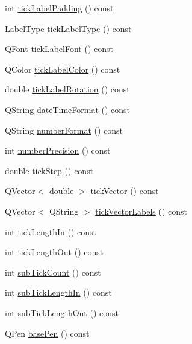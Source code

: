 \begin{DoxyCompactItemize}
\item 
int \hyperlink{class_q_c_p_axis_af7bc2fac3f95949ecd0204d20dc1463b}{tick\-Label\-Padding} () const 
\item 
\hyperlink{class_q_c_p_axis_a4a7da0166f755f5abac23b765d184cad}{Label\-Type} \hyperlink{class_q_c_p_axis_a8a6f58a1ce12cfc4fadd379167668e8d}{tick\-Label\-Type} () const 
\item 
Q\-Font \hyperlink{class_q_c_p_axis_af6d7ad17f3398b114a413f7a3dc5ef9d}{tick\-Label\-Font} () const 
\item 
Q\-Color \hyperlink{class_q_c_p_axis_ac86d0636aa55ddd94df171f609897a32}{tick\-Label\-Color} () const 
\item 
double \hyperlink{class_q_c_p_axis_ab9199d72b8c4c06cc6c9b928c30d00d2}{tick\-Label\-Rotation} () const 
\item 
Q\-String \hyperlink{class_q_c_p_axis_a132b54ae184a12ed24c9af24f53dc70b}{date\-Time\-Format} () const 
\item 
Q\-String \hyperlink{class_q_c_p_axis_ae6729b40845b29ffa5a440aa53cec215}{number\-Format} () const 
\item 
int \hyperlink{class_q_c_p_axis_a91cb2825060ac79a889296377fe0c7c1}{number\-Precision} () const 
\item 
double \hyperlink{class_q_c_p_axis_a0e6120d24266544441ab691f316a1b03}{tick\-Step} () const 
\item 
Q\-Vector$<$ double $>$ \hyperlink{class_q_c_p_axis_a5b00b14f480f926df976cc6c52309e78}{tick\-Vector} () const 
\item 
Q\-Vector$<$ Q\-String $>$ \hyperlink{class_q_c_p_axis_a64e6fa81f943ad33dcaf3fa606687b93}{tick\-Vector\-Labels} () const 
\item 
int \hyperlink{class_q_c_p_axis_a59265d65c5034695ac2578bccbbb0f4a}{tick\-Length\-In} () const 
\item 
int \hyperlink{class_q_c_p_axis_ae1b3d7473f50ba8544b2027c1cdc80f2}{tick\-Length\-Out} () const 
\item 
int \hyperlink{class_q_c_p_axis_a290b4c1375476826daa10e914cb71dab}{sub\-Tick\-Count} () const 
\item 
int \hyperlink{class_q_c_p_axis_a052e6ab2ada7e87fa5e5831dcbd4a517}{sub\-Tick\-Length\-In} () const 
\item 
int \hyperlink{class_q_c_p_axis_a091fdf8d1b3f9660e38b854578efb9bc}{sub\-Tick\-Length\-Out} () const 
\item 
Q\-Pen \hyperlink{class_q_c_p_axis_a4f6a7cd46fb104b1dad93e29cc78fe74}{base\-Pen} () const 
\item 

\end{DoxyCompactItemize}

